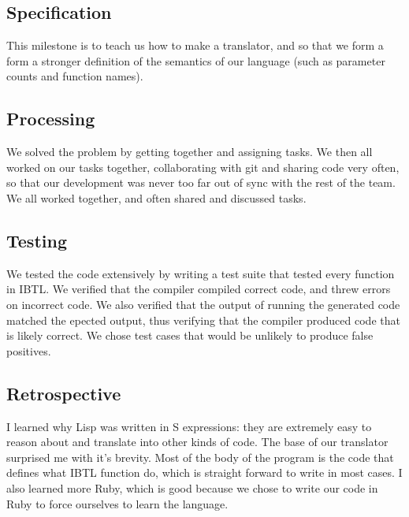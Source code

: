 \documentclass[12pt]{article}
\begin{document}
\subsection{Specification}
This milestone is to teach us how to make a translator, and so that we form a
form a stronger definition of the semantics of our language (such as parameter
counts and function names).

\subsection{Processing}
We solved the problem by getting together and assigning tasks. We then all
worked on our tasks together, collaborating with git and sharing code very
often, so that our development was never too far out of sync with the rest of
the team. We all worked together, and often shared and discussed tasks.

\subsection{Testing}
We tested the code extensively by writing a test suite that tested every
function in IBTL. We verified that the compiler compiled correct code, and
threw errors on incorrect code. We also verified that the output of running the
generated code matched the epected output, thus verifying that the compiler
produced code that is likely correct. We chose test cases that would be
unlikely to produce false positives.

\subsection{Retrospective}
I learned why Lisp was written in S expressions: they are extremely easy to
reason about and translate into other kinds of code. The base of our translator
surprised me with it's brevity. Most of the body of the program is the code
that defines what IBTL function do, which is straight forward to write in most
cases. I also learned more Ruby, which is good because we chose to write our
code in Ruby to force ourselves to learn the language.
\end{document}
